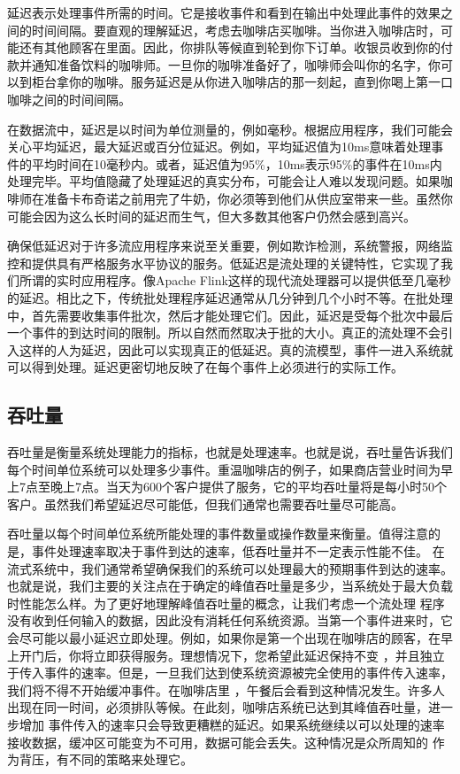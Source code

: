 \documentclass[cn,11pt,chinese]{elegantbook}
\begin{document}
延迟表示处理事件所需的时间。它是接收事件和看到在输出中处理此事件的效果之间的时间间隔。要直观的理解延迟，考虑去咖啡店买咖啡。当你进入咖啡店时，可能还有其他顾客在里面。因此，你排队等候直到轮到你下订单。收银员收到你的付款并通知准备饮料的咖啡师。一旦你的咖啡准备好了，咖啡师会叫你的名字，你可以到柜台拿你的咖啡。服务延迟是从你进入咖啡店的那一刻起，直到你喝上第一口咖啡之间的时间间隔。

在数据流中，延迟是以时间为单位测量的，例如毫秒。根据应用程序，我们可能会关心平均延迟，最大延迟或百分位延迟。例如，平均延迟值为10ms意味着处理事件的平均时间在10毫秒内。或者，延迟值为95\%，10ms表示95\%的事件在10ms内处理完毕。平均值隐藏了处理延迟的真实分布，可能会让人难以发现问题。如果咖啡师在准备卡布奇诺之前用完了牛奶，你必须等到他们从供应室带来一些。虽然你可能会因为这么长时间的延迟而生气，但大多数其他客户仍然会感到高兴。

确保低延迟对于许多流应用程序来说至关重要，例如欺诈检测，系统警报，网络监控和提供具有严格服务水平协议的服务。低延迟是流处理的关键特性，它实现了我们所谓的实时应用程序。像Apache
Flink这样的现代流处理器可以提供低至几毫秒的延迟。相比之下，传统批处理程序延迟通常从几分钟到几个小时不等。在批处理中，首先需要收集事件批次，然后才能处理它们。因此，延迟是受每个批次中最后一个事件的到达时间的限制。所以自然而然取决于批的大小。真正的流处理不会引入这样的人为延迟，因此可以实现真正的低延迟。真的流模型，事件一进入系统就可以得到处理。延迟更密切地反映了在每个事件上必须进行的实际工作。

\hypertarget{ux541eux5410ux91cf}{%
\subsection{吞吐量}\label{ux541eux5410ux91cf}}

吞吐量是衡量系统处理能力的指标，也就是处理速率。也就是说，吞吐量告诉我们每个时间单位系统可以处理多少事件。重温咖啡店的例子，如果商店营业时间为早上7点至晚上7点。当天为600个客户提供了服务，它的平均吞吐量将是每小时50个客户。虽然我们希望延迟尽可能低，但我们通常也需要吞吐量尽可能高。

吞吐量以每个时间单位系统所能处理的事件数量或操作数量来衡量。值得注意的是，事件处理速率取决于事件到达的速率，低吞吐量并不一定表示性能不佳。
在流式系统中，我们通常希望确保我们的系统可以处理最大的预期事件到达的速率。也就是说，我们主要的关注点在于确定的峰值吞吐量是多少，当系统处于最大负载时性能怎么样。为了更好地理解峰值吞吐量的概念，让我们考虑一个流处理
程序没有收到任何输入的数据，因此没有消耗任何系统资源。当第一个事件进来时，它会尽可能以最小延迟立即处理。例如，如果你是第一个出现在咖啡店的顾客，在早上开门后，你将立即获得服务。理想情况下，您希望此延迟保持不变
，并且独立于传入事件的速率。但是，一旦我们达到使系统资源被完全使用的事件传入速率，我们将不得不开始缓冲事件。在咖啡店里
，午餐后会看到这种情况发生。许多人出现在同一时间，必须排队等候。在此刻，咖啡店系统已达到其峰值吞吐量，进一步增加
事件传入的速率只会导致更糟糕的延迟。如果系统继续以可以处理的速率接收数据，缓冲区可能变为不可用，数据可能会丢失。这种情况是众所周知的
作为背压，有不同的策略来处理它。
\end{document}
